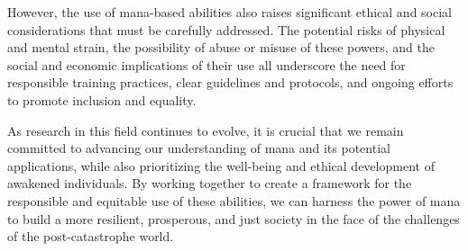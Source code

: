 \documentclass[12pt, a4paper]{article}
\begin{document}
However, the use of mana-based abilities also raises significant ethical and social considerations that must be carefully addressed. The potential risks of physical and mental strain, the possibility of abuse or misuse of these powers, and the social and economic implications of their use all underscore the need for responsible training practices, clear guidelines and protocols, and ongoing efforts to promote inclusion and equality.

As research in this field continues to evolve, it is crucial that we remain committed to advancing our understanding of mana and its potential applications, while also prioritizing the well-being and ethical development of awakened individuals. By working together to create a framework for the responsible and equitable use of these abilities, we can harness the power of mana to build a more resilient, prosperous, and just society in the face of the challenges of the post-catastrophe world.



\end{document}
